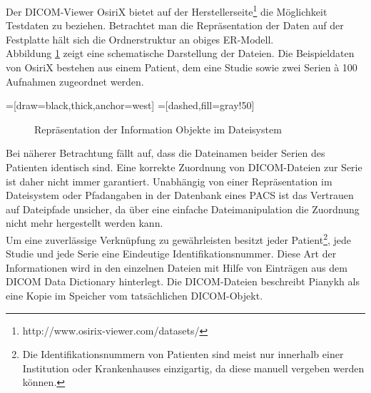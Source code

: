 Der DICOM-Viewer OsiriX bietet auf der Herstellerseite\footnote{http://www.osirix-viewer.com/datasets/} die Möglichkeit Testdaten zu beziehen. Betrachtet man die Repräsentation der Daten auf der Festplatte hält sich die Ordnerstruktur an obiges ER-Modell.\\
Abbildung \ref{filesystemrep} zeigt eine schematische Darstellung der Dateien. Die Beispieldaten von OsiriX bestehen aus einem Patient, dem eine Studie sowie zwei Serien à 100 Aufnahmen zugeordnet werden.

=[draw=black,thick,anchor=west]
=[dashed,fill=gray!50]
\begin{figure}[htbp]
\centering
\caption{Repräsentation der Information Objekte im Dateisystem}
\label{filesystemrep}
\end{figure}

Bei näherer Betrachtung fällt auf, dass die Dateinamen beider Serien des Patienten identisch sind. Eine korrekte Zuordnung von DICOM-Dateien zur Serie ist daher nicht immer garantiert. Unabhängig von einer Repräsentation im Dateisystem oder Pfadangaben in der Datenbank eines PACS ist das Vertrauen auf Dateipfade unsicher, da über eine einfache Dateimanipulation die Zuordnung nicht mehr hergestellt werden kann.\\
Um eine zuverlässige Verknüpfung zu gewährleisten besitzt jeder Patient\footnote{Die Identifikationsnummern von Patienten sind meist nur innerhalb einer Institution oder Krankenhauses einzigartig, da diese manuell vergeben werden können\cite[5.6.2]{pianykh:dicom}.}, jede Studie und jede Serie eine Eindeutige Identifikationsnummer. Diese Art der Informationen wird in den einzelnen Dateien mit Hilfe von Einträgen aus dem DICOM Data Dictionary\cite{dicom:dd} hinterlegt. Die DICOM-Dateien beschreibt Pianykh \cite[S. 47]{pianykh:dicom}
als eine Kopie im Speicher vom tatsächlichen DICOM-Objekt.

